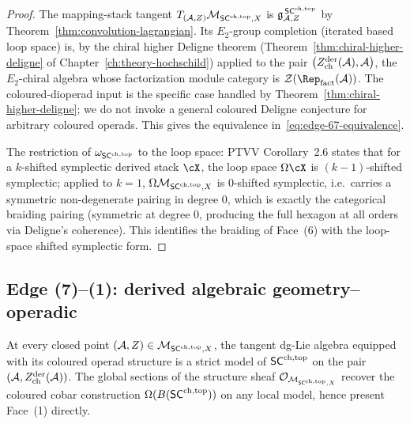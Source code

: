 \begin{proof}
The mapping-stack tangent $T_{(\mathcal{A},Z)}\mathcal{M}_{\mathsf{SC}^{\mathrm{ch},\mathrm{top}},X}$ is
$\mathfrak{g}^{\,\mathsf{SC}^{\mathrm{ch},\mathrm{top}}}_{\mathcal{A},Z}$ by
Theorem~\ref{thm:convolution-lagrangian}. Its $E_2$-group
completion (iterated based loop space) is, by the chiral higher
Deligne theorem (Theorem~\ref{thm:chiral-higher-deligne} of
Chapter~\ref{ch:theory-hochschild}) applied to the pair
$\bigl(Z^{\mathrm{der}}_{\mathrm{ch}}(\mathcal{A}),\mathcal{A}\bigr)$, the
$E_2$-chiral algebra whose factorization module category is
$\cZ(\Rep_{\mathrm{fact}}(\cA))$. The coloured-dioperad input
is the specific case handled by Theorem~\ref{thm:chiral-higher-deligne};
we do not invoke a general coloured Deligne conjecture for
arbitrary coloured operads. This gives the equivalence
in~\eqref{eq:edge-67-equivalence}.

The restriction of $\omega_{\mathsf{SC}^{\mathrm{ch},\mathrm{top}}}$ to the loop space:
PTVV Corollary~2.6 states that for a $k$-shifted symplectic derived
stack $\cX$, the loop space $\Omega\cX$ is $(k-1)$-shifted
symplectic; applied to $k=1$, $\Omega\mathcal{M}_{\mathsf{SC}^{\mathrm{ch},\mathrm{top}},X}$ is
$0$-shifted symplectic, i.e.\ carries a symmetric non-degenerate
pairing in degree $0$, which is exactly the categorical braiding
pairing (symmetric at degree $0$, producing the full hexagon at
all orders via Deligne's coherence). This identifies the braiding
of Face~(6) with the loop-space shifted symplectic form.
\end{proof}

\subsection{Edge (7)--(1): derived algebraic geometry--operadic}\label{subsec:edge-71}

\begin{theorem}\label{thm:edge-71}%
At every closed point $(\mathcal{A},Z)\in\mathcal{M}_{\mathsf{SC}^{\mathrm{ch},\mathrm{top}},X}$, the
tangent dg-Lie algebra equipped with its coloured operad structure
is a strict model of $\mathsf{SC}^{\mathrm{ch},\mathrm{top}}$ on the pair
$(\mathcal{A},Z^{\mathrm{der}}_{\mathrm{ch}}(\mathcal{A}))$. The global
sections of the structure sheaf
$\mathcal{O}_{\mathcal{M}_{\mathsf{SC}^{\mathrm{ch},\mathrm{top}},X}}$ recover the coloured cobar
construction $\Omega(B(\mathsf{SC}^{\mathrm{ch},\mathrm{top}}))$ on any local model, hence present
Face~(1) directly.
\end{theorem}

